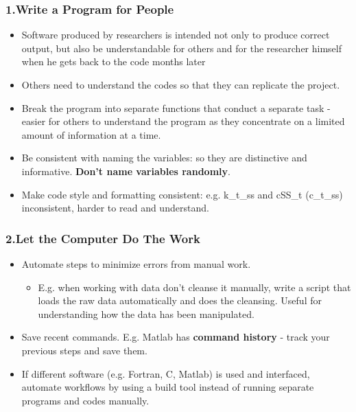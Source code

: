 \documentclass{beamer}
\newcommand{\highlight}[1]{{\color{blue}{#1}}}
\renewcommand{\highlight}[1]{{\textbf{#1}}}
\begin{document}
\begin{frame}
\frametitle{1.Write a Program for People}
\begin{itemize}
\item Software produced by researchers is intended not only to produce correct output, but also be understandable for others and for the researcher himself when he gets back to the code months later
\item Others need to understand the codes so that they can replicate the project.
\item Break the program into separate functions that conduct a separate task - easier for others to understand the program as they concentrate on a limited amount of information at a time.
\item Be consistent with naming the variables: so they are distinctive and informative. \highlight{Don't name variables randomly}.
\item Make code style and formatting consistent: e.g. k\_t\_ss and cSS\_t (c\_t\_ss) inconsistent, harder to read and understand.
\end{itemize}
\end{frame}
\begin{frame}
\frametitle{2.Let the Computer Do The Work}
\begin{itemize}
\item Automate steps to minimize errors from manual work.
\begin{itemize}
\item E.g. when working with data don't cleanse it manually, write a script that loads the raw data automatically and does the cleansing. Useful for understanding how the data has been manipulated.
\end{itemize}
\item Save recent commands. E.g. Matlab has \highlight{command history} - track your previous steps and save them.
\item If different software (e.g. Fortran, C, Matlab) is used and interfaced, automate workflows by using a build tool instead of running separate programs and codes manually.
\end{itemize}
\end{frame}
\end{document}
